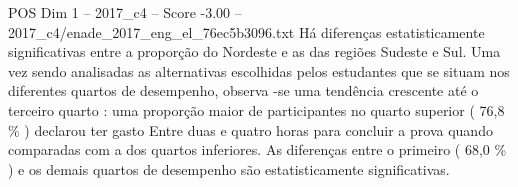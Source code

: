 \begin{textsample}{POS Dim 1 – 2017\_c4 – Score -3.00 – 2017\_c4/enade\_2017\_eng\_el\_76ec5b3096.txt}
Há diferenças estatisticamente significativas entre a proporção do Nordeste e as das regiões Sudeste e Sul.
Uma vez sendo analisadas as alternativas escolhidas pelos estudantes que se situam nos diferentes quartos de desempenho, observa -se uma tendência crescente até o terceiro quarto : uma proporção maior de participantes no quarto superior ( 76,8 \% ) declarou ter gasto Entre duas e quatro horas para concluir a prova quando comparadas com a dos quartos inferiores.
As diferenças entre o primeiro ( 68,0 \% ) e os demais quartos de desempenho são estatisticamente significativas.

\end{textsample}
